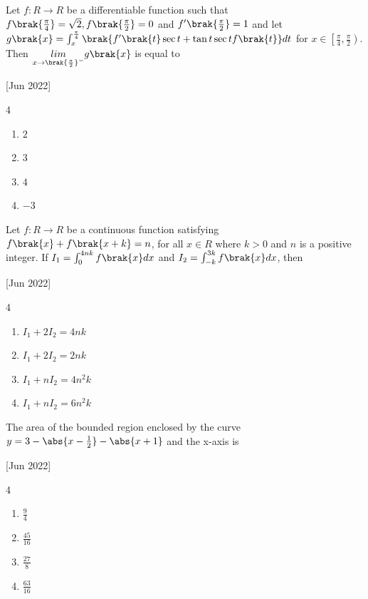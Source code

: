     \item Let $f:R\to R$ be a differentiable function such that $f\brak{\frac{\pi}{4}}=\sqrt{2},f\brak{\frac{\pi}{2}}=0$ and $f'\brak{\frac{\pi}{2}}=1$ and let $g\brak{x}=\int_x^{\frac{\pi}{4}}\brak{f'\brak{t}\sec t+\tan t\sec tf\brak{t}}dt$ for $x\in \left[ \frac{\pi}{4},\frac{\pi}{2}\right)$. Then $\underset{x\to\brak{\frac{\pi}{2}}^{-}}{lim}g\brak{x}$ is equal to
    
    \hfill{[Jun 2022]}

        \begin{multicols}{4}
            \begin{enumerate}
                \item $2$
                \item $3$
                \item $4$
                \item $-3$
            \end{enumerate}
        \end{multicols}
		
    \item Let $f:R\to R$ be a continuous function satisfying $f\brak{x}+f\brak{x+k}=n$, for all $x\in R$ where $k>0$ and $n$ is a positive integer. If $I_1=\int_0^{4nk}f\brak{x}dx$ and $I_2=\int_{-k}^{3k}f\brak{x}dx$, then
    
    \hfill{[Jun 2022]}

        \begin{multicols}{4}
            \begin{enumerate}
                \item $I_1+2I_2=4nk$
                \item $I_1+2I_2=2nk$
                \item $I_1+nI_2=4n^2k$
                \item $I_1+nI_2=6n^2k$
            \end{enumerate}
        \end{multicols}

    \item The area of the bounded region enclosed by the curve $y=3-\abs{x-\frac{1}{2}}-\abs{x+1}$ and the x-axis is
    
    \hfill{[Jun 2022]}

        \begin{multicols}{4}
            \begin{enumerate}
                \item $\frac{9}{4}$
                \item $\frac{45}{16}$
                \item $\frac{27}{8}$
                \item $\frac{63}{16}$
            \end{enumerate}
        \end{multicols}

